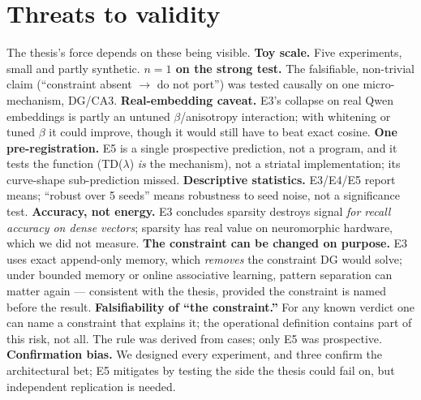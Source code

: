 \documentclass[11pt]{article}
\begin{document}
\section{Threats to validity}
\label{sec:threats}
The thesis's force depends on these being visible.
\textbf{Toy scale.} Five experiments, small and partly synthetic. \textbf{$n{=}1$ on the strong test.} The falsifiable, non-trivial claim (``constraint absent $\to$ do not port'') was tested causally on one micro-mechanism, DG/CA3. \textbf{Real-embedding caveat.} E3's collapse on real Qwen embeddings is partly an untuned $\beta$/anisotropy interaction; with whitening or tuned $\beta$ it could improve, though it would still have to beat exact cosine. \textbf{One pre-registration.} E5 is a single prospective prediction, not a program, and it tests the function (TD($\lambda$) \emph{is} the mechanism), not a striatal implementation; its curve-shape sub-prediction missed. \textbf{Descriptive statistics.} E3/E4/E5 report means; ``robust over 5 seeds'' means robustness to seed noise, not a significance test. \textbf{Accuracy, not energy.} E3 concludes sparsity destroys signal \emph{for recall accuracy on dense vectors}; sparsity has real value on neuromorphic hardware, which we did not measure. \textbf{The constraint can be changed on purpose.} E3 uses exact append-only memory, which \emph{removes} the constraint DG would solve; under bounded memory or online associative learning, pattern separation can matter again --- consistent with the thesis, provided the constraint is named before the result. \textbf{Falsifiability of ``the constraint.''} For any known verdict one can name a constraint that explains it; the operational definition contains part of this risk, not all. The rule was derived from cases; only E5 was prospective. \textbf{Confirmation bias.} We designed every experiment, and three confirm the architectural bet; E5 mitigates by testing the side the thesis could fail on, but independent replication is needed.
\end{document}
